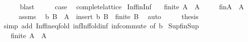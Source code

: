 \begin{isabellebody}
\ \ \ \ \isamarkupfalse%
\ blast\isanewline
\ \ \isamarkupfalse%
\ \isamarkupfalse%
\ {\isacharquery}{\kern0pt}case\ \isacommand{{\isachardot}{\kern0pt}}\isamarkupfalse%
\isanewline
{}\isamarkupfalse%
%
\endisatagproof
{\isafoldproof}%
%
\isadelimproof
\isanewline
%
\endisadelimproof
\isanewline
{}\isamarkupfalse%
\isanewline
\isanewline
{}\isamarkupfalse%
\ complete{\isacharunderscore}{\kern0pt}lattice\isanewline
{}\isanewline
\isanewline
{}\isamarkupfalse%
\ Inf{\isacharunderscore}{\kern0pt}fin{\isacharunderscore}{\kern0pt}Inf{\isacharcolon}{\kern0pt}\isanewline
\ \ \ {\isachardoublequoteopen}finite\ A{\isachardoublequoteclose}\ \ {\isachardoublequoteopen}A\ {\isasymnoteq}\ {\isacharbraceleft}{\kern0pt}{\isacharbraceright}{\kern0pt}{\isachardoublequoteclose}\isanewline
\ \ \ {\isachardoublequoteopen}{\isasymSqinter}\isactrlsub f\isactrlsub i\isactrlsub nA\ {\isacharequal}{\kern0pt}\ {\isasymSqinter}A{\isachardoublequoteclose}\isanewline
%
\isadelimproof
%
\endisadelimproof
%
\isatagproof
{}\isamarkupfalse%
\ {\isacharminus}{\kern0pt}\isanewline
\ \ \isamarkupfalse%
\ assms\ \isamarkupfalse%
\ b\ B\ \ {\isachardoublequoteopen}A\ {\isacharequal}{\kern0pt}\ insert\ b\ B{\isachardoublequoteclose}\ \ {\isachardoublequoteopen}finite\ B{\isachardoublequoteclose}\ \isamarkupfalse%
\ auto\isanewline
\ \ \isamarkupfalse%
\ \isamarkupfalse%
\ {\isacharquery}{\kern0pt}thesis\isanewline
\ \ \ \ \isamarkupfalse%
\ {\isacharparenleft}{\kern0pt}simp\ add{\isacharcolon}{\kern0pt}\ Inf{\isacharunderscore}{\kern0pt}fin{\isachardot}{\kern0pt}eq{\isacharunderscore}{\kern0pt}fold\ inf{\isacharunderscore}{\kern0pt}Inf{\isacharunderscore}{\kern0pt}fold{\isacharunderscore}{\kern0pt}inf\ inf{\isachardot}{\kern0pt}commute\ {\isacharbrackleft}{\kern0pt}of\ b{\isacharbrackright}{\kern0pt}{\isacharparenright}{\kern0pt}\isanewline
{}\isamarkupfalse%
%
\endisatagproof
{\isafoldproof}%
%
\isadelimproof
\isanewline
%
\endisadelimproof
\isanewline
{}\isamarkupfalse%
\ Sup{\isacharunderscore}{\kern0pt}fin{\isacharunderscore}{\kern0pt}Sup{\isacharcolon}{\kern0pt}\isanewline
\ \ \ {\isachardoublequoteopen}finite\ A{\isachardoublequoteclose}\ \ {\isachardoublequoteopen}A\ {\isasymnoteq}\ {\isacharbraceleft}{\kern0pt}{\isacharbraceright}{\kern0pt}{\isachardoublequoteclose}\isanewline

\end{isabellebody}
